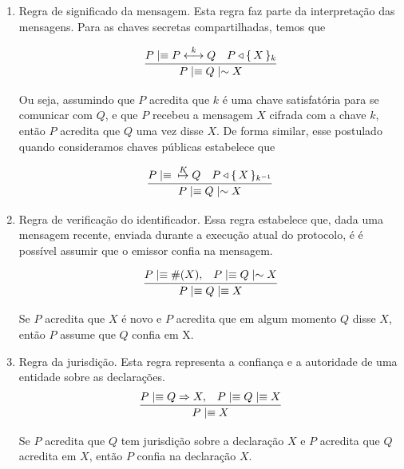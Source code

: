 \begin{enumerate}[(P1)]

 \item Regra de significado da mensagem. Esta regra faz parte da interpretação das mensagens. 
    Para as chaves secretas compartilhadas, temos que

    \begin{displaymath}
        \infer
        {{P}\mid\equiv{{Q}\mid\sim{X}}}
        {{P}\mid\equiv{\Share{P}{k}{Q}}& {P}\triangleleft{\Encrypt{X}{k}}}
    \end{displaymath}

Ou seja, assumindo que $P$ acredita que $k$ é uma chave satisfatória para se comunicar com $Q$, e que 
$P$ recebeu a mensagem $X$ cifrada com a chave $k$, então $P$ acredita que $Q$ uma vez disse $X$. 
De forma similar, esse postulado quando consideramos chaves p\'{u}blicas estabelece que

    \begin{displaymath}
        \infer
        {{P}\mid\equiv{{Q}\mid\sim{X}}}
        {{P}\mid\equiv{\PubKey{K}{Q}}& {P}\triangleleft{\Encrypt{X}{k ^{-1}}}}
    \end{displaymath}



\item Regra de verificação do identificador. Essa regra estabelece que, dada uma mensagem recente, 
enviada durante a execução atual do protocolo, \'{e} \'{e} poss\'{i}vel 
assumir que o emissor confia na mensagem.

  \begin{displaymath}
    \infer
    {{P}\mid\equiv{{Q}\mid\equiv{X}}}
    {{P}\mid\equiv{\#(X),}& {P}\mid\equiv{{Q}\mid\sim{X}}}
  \end{displaymath}

   Se $P$ acredita que $X$ é novo e $P$ acredita que em algum momento $Q$ disse $X$, então $P$ assume que $Q$ confia em X.

\item Regra da jurisdição. Esta regra representa a confiança e a autoridade de uma entidade sobre as declarações.
\begin{displaymath}
    \infer
    {{P}\mid\equiv{X}}
    {{P}\mid\equiv{{Q}\Rightarrow {X},}& {P}\mid\equiv{{Q}\mid\equiv{X}}}
  \end{displaymath}

   Se $P$  acredita que $Q$ tem jurisdição sobre a declaração $X$ e $P$ acredita que $Q$ acredita em $X$, então $P$ confia na declaração $X$.

\end{enumerate}

